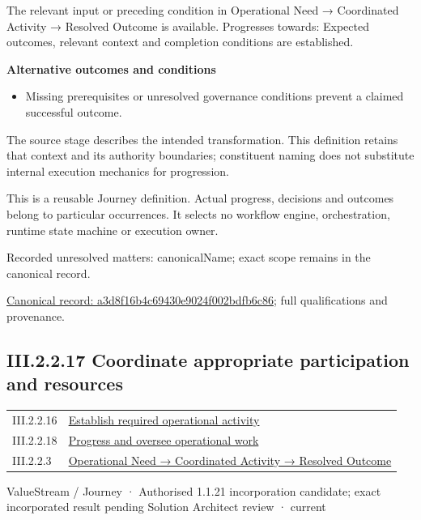 The relevant input or preceding condition in Operational Need → Coordinated Activity → Resolved Outcome is available. Progresses towards: Expected outcomes, relevant context and completion conditions are established.



\par\medskip\textbf{Alternative outcomes and conditions}\par


\begin{itemize}


\item Missing prerequisites or unresolved governance conditions prevent a claimed successful outcome.

\end{itemize}


The source stage describes the intended transformation. This definition retains that context and its authority boundaries; constituent naming does not substitute internal execution mechanics for progression.



This is a reusable Journey definition. Actual progress, decisions and outcomes belong to particular occurrences. It selects no workflow engine, orchestration, runtime state machine or execution owner.


{\small Recorded unresolved matters: canonicalName; exact scope remains in the canonical record.}\par
{\footnotesize \href{../../../../../../../continuum/strategy/value-stream/a3d8f16b4c69430e9024f002bdfb6c86.md}{Canonical record: a3d8f16b4c69430e9024f002bdfb6c86}; full qualifications and provenance.}\par
\subsection*{III.2.2.17 Coordinate appropriate participation and resources}
\label{navigation:III.2.2.17}

\begin{longtable}{p{.22\linewidth}p{.73\linewidth}}
III.2.2.16 & \hyperref[element:a3d8f16b4c69430e9024f002bdfb6c86]{Establish required operational activity} \\
III.2.2.18 & \hyperref[element:b404dffef05e4f2bb9d414e4d1ed33af]{Progress and oversee operational work} \\
III.2.2.3 & \hyperref[element:beea615ca7b34bbcbd0ad3a2a6ab2cff]{Operational Need → Coordinated Activity → Resolved Outcome} \\
\end{longtable}
\label{element:429446296e4b4a64a11b1b3d8385b12e}
{\small ValueStream / Journey · Authorised 1.1.21 incorporation candidate; exact incorporated result pending Solution Architect review · current}\par

